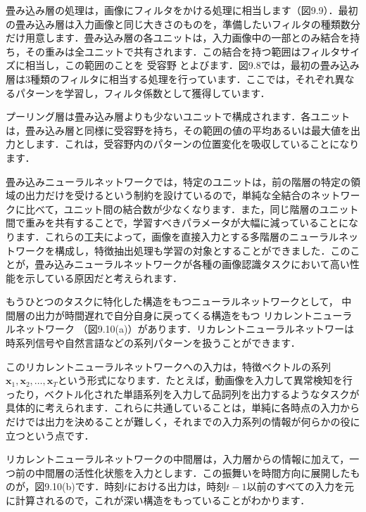 
畳み込み層の処理は，画像にフィルタをかける処理に相当します（図9.9）．最初の畳み込み層は入力画像と同じ大きさのものを，準備したいフィルタの種類数分だけ用意します．畳み込み層の各ユニットは，入力画像中の一部とのみ結合を持ち，その重みは全ユニットで共有されます．この結合を持つ範囲はフィルタサイズに相当し，この範囲のことを
受容野
とよびます．図9.8では，最初の畳み込み層は3種類のフィルタに相当する処理を行っています．ここでは，それぞれ異なるパターンを学習し，フィルタ係数として獲得しています．

プーリング層は畳み込み層よりも少ないユニットで構成されます．各ユニットは，畳み込み層と同様に受容野を持ち，その範囲の値の平均あるいは最大値を出力とします．これは，受容野内のパターンの位置変化を吸収していることになります．

畳み込みニューラルネットワークでは，特定のユニットは，前の階層の特定の領域の出力だけを受けるという制約を設けているので，単純な全結合のネットワークに比べて，ユニット間の結合数が少なくなります．また，同じ階層のユニット間で重みを共有することで，学習すべきパラメータが大幅に減っていることになります．これらの工夫によって，画像を直接入力とする多階層のニューラルネットワークを構成し，特徴抽出処理も学習の対象とすることができました．このことが，畳み込みニューラルネットワークが各種の画像認識タスクにおいて高い性能を示している原因だと考えられます．


もうひとつのタスクに特化した構造をもつニューラルネットワークとして，
中間層の出力が時間遅れで自分自身に戻ってくる構造をもつ
リカレントニューラルネットワーク
（図9.10(a)）があります．リカレントニューラルネットワーは時系列信号や自然言語などの系列パターンを扱うことができます．

このリカレントニューラルネットワークへの入力は，特徴ベクトルの系列$\bm{x}_1,\bm{x}_2,\dots, \bm{x}_T $という形式になります．たとえば，動画像を入力して異常検知を行ったり，ベクトル化された単語系列を入力して品詞列を出力するようなタスクが具体的に考えられます．これらに共通していることは，単純に各時点の入力からだけでは出力を決めることが難しく，それまでの入力系列の情報が何らかの役に立つという点です．

リカレントニューラルネットワークの中間層は，入力層からの情報に加えて，一つ前の中間層の活性化状態を入力とします．この振舞いを時間方向に展開したものが，図9.10(b)です．時刻$t$における出力は，時刻$t-1$以前のすべての入力を元に計算されるので，これが深い構造をもっていることがわかります．



